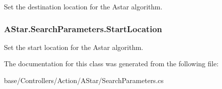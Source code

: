 Set the destination location for the Astar algorithm. 

\hypertarget{classAStar_1_1SearchParameters_afaa7cfd59fcd28741a9d681b11d8e12d}{
\subsubsection[{Start\-Location}]{ A\-Star.\-Search\-Parameters.\-Start\-Location}}\label{classAStar_1_1SearchParameters_afaa7cfd59fcd28741a9d681b11d8e12d}


Set the start location for the Astar algorithm. 



The documentation for this class was generated from the following file\-:\begin{DoxyCompactItemize}
\item 
base/\-Controllers/\-Action/\-A\-Star/Search\-Parameters.\-cs\end{DoxyCompactItemize}
